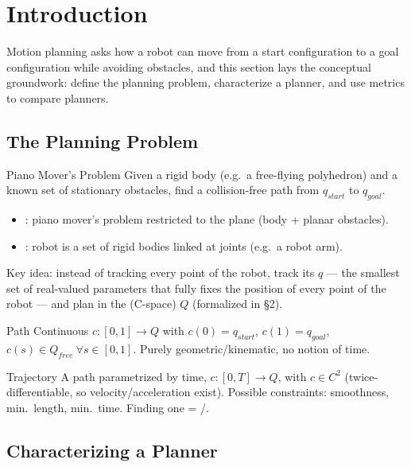 \section{Introduction}

Motion planning asks how a robot can move from a start configuration to a goal configuration while avoiding obstacles, and this section lays the conceptual groundwork: define the planning problem, characterize a planner, and use metrics to compare planners.

\subsection{The Planning Problem}

\begin{defbox}{Piano Mover's Problem}
Given a rigid body (e.g.\ a free-flying polyhedron) and a known set of stationary obstacles, find a collision-free path from $q_{start}$ to $q_{goal}$.
\end{defbox}
\begin{itemize}
\item {}: piano mover's problem restricted to the plane (body + planar obstacles).
\item {}: robot is a set of rigid bodies linked at joints (e.g.\ a robot arm).
\end{itemize}

Key idea: instead of tracking every point of the robot, track its  $q$ --- the smallest set of real-valued parameters that fully fixes the position of every point of the robot --- and plan in the  (C-space) $Q$ (formalized in \S2).

\begin{defbox}{Path}
Continuous $c:[0,1]\to Q$ with $c(0)=q_{start}$, $c(1)=q_{goal}$, $c(s)\in Q_{free}\ \forall s\in[0,1]$. Purely geometric/kinematic, no notion of time.
\end{defbox}
\begin{defbox}{Trajectory}
A path parametrized by time, $c:[0,T]\to Q$, with $c\in C^2$ (twice-differentiable, so velocity/acceleration exist). Possible constraints: smoothness, min.\ length, min.\ time. Finding one = /.
\end{defbox}

\subsection{Characterizing a Planner}

